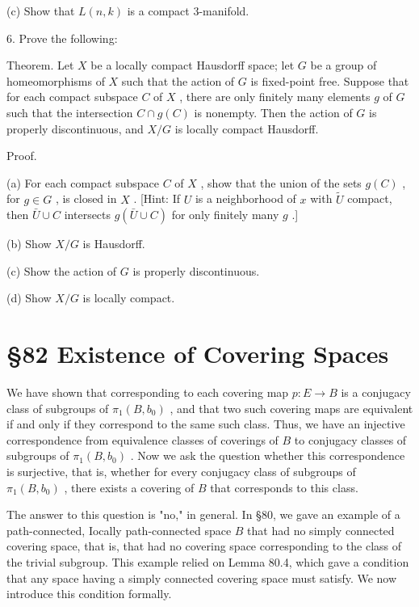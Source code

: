 (c) Show that \(L\left( {n,k}\right)\) is a compact 3-manifold.

6. Prove the following:

Theorem. Let \(X\) be a locally compact Hausdorff space; let \(G\) be a group of homeomorphisms of \(X\) such that the action of \(G\) is fixed-point free. Suppose that for each compact subspace \(C\) of \(X\) , there are only finitely many elements \(g\) of \(G\) such that the intersection \(C \cap  g\left( C\right)\) is nonempty. Then the action of \(G\) is properly discontinuous, and \(X/G\) is locally compact Hausdorff.

Proof.

(a) For each compact subspace \(C\) of \(X\) , show that the union of the sets \(g\left( C\right)\) , for \(g \in  G\) , is closed in \(X\) . [Hint: If \(U\) is a neighborhood of \(x\) with \(\widetilde{U}\) compact, then \(\bar{U} \cup  C\) intersects \(g\left( {\bar{U} \cup  C}\right)\) for only finitely many \(g\) .]

(b) Show \(X/G\) is Hausdorff.

(c) Show the action of \(G\) is properly discontinuous.

(d) Show \(X/G\) is locally compact.

\section*{ \S 82 Existence of Covering Spaces}

We have shown that corresponding to each covering map \(p : E \rightarrow  B\) is a conjugacy class of subgroups of \({\pi }_{1}\left( {B,{b}_{0}}\right)\) , and that two such covering maps are equivalent if and only if they correspond to the same such class. Thus, we have an injective correspondence from equivalence classes of coverings of \(B\) to conjugacy classes of subgroups of \({\pi }_{1}\left( {B,{b}_{0}}\right)\) . Now we ask the question whether this correspondence is surjective, that is, whether for every conjugacy class of subgroups of \({\pi }_{1}\left( {B,{b}_{0}}\right)\) , there exists a covering of \(B\) that corresponds to this class.

The answer to this question is "no," in general. In  \S 80, we gave an example of a path-connected, Iocally path-connected space \(B\) that had no simply connected covering space, that is, that had no covering space corresponding to the class of the trivial subgroup. This example relied on Lemma 80.4, which gave a condition that any space having a simply connected covering space must satisfy. We now introduce this condition formally.

